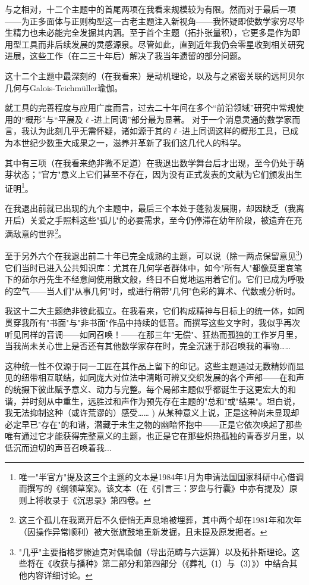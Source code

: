 {{与之相对，十二个主题中的首尾两项在我看来规模较为有限。然而对于最后一项——为正多面体与正则构型这一古老主题注入新视角——我怀疑即使数学家穷尽毕生精力也未必能完全发掘其内涵。至于首个主题（拓扑张量积），它更多是作为即用型工具而非后续发展的灵感源泉。尽管如此，直到近年我仍会零星收到相关研究进展，这些工作（在二三十年后）解决了我当年遗留的部分问题。

这十二个主题中最深刻的（在我看来）是动机理论，以及与之紧密关联的远阿贝尔几何与Galois-Teichmüller瑜伽。

就工具的完善程度与应用广度而言，过去二十年间在多个“前沿领域”研究中常规使用的“概形”与“平展及$\ell$-进上同调”部分最为显著。
对于一个消息灵通的数学家而言，我认为此刻几乎无需怀疑，诸如源于其的$\ell$-进上同调这样的概形工具，已成为本世纪少数重大成果之一，滋养并革新了我们这几代人的科学。

其中有三项（在我看来绝非微不足道）在我退出数学舞台后才出现，至今仍处于萌芽状态；"官方"意义上它们甚至不存在，因为没有正式发表的文献为它们颁发出生证明\footnote{唯一"半官方"提及这三个主题的文本是1984年1月为申请法国国家科研中心借调而撰写的《纲领草案》。该文本（在《引言三：罗盘与行囊》中亦有提及）原则上将收录于《沉思录》第四卷。}。

在我退出前就已出现的九个主题中，最后三个本处于蓬勃发展期，却因缺乏（我离开后）关爱之手照料这些"孤儿"的必要需求，至今仍停滞在幼年阶段，被遗弃在充满敌意的世界\footnote{这三个孤儿在我离开后不久便悄无声息地被埋葬，其中两个却在1981年和次年（因操作异常顺利）被大张旗鼓地重新发掘，且未提及原发掘者。}。

至于另外六个在我退出前二十年已完全成熟的主题，可以说（除一两点保留意见\footnote{"几乎"主要指格罗滕迪克对偶瑜伽（导出范畴与六运算）以及拓扑斯理论。这些将在《收获与播种》第二部分和第四部分（《葬礼（1）与（3）》）中结合其他内容详细讨论。}）它们当时已进入公共知识库：尤其在几何学者群体中，如今"所有人"都像莫里哀笔下的茹尔丹先生不经意间使用散文般，终日不自觉地运用着它们。它们已成为呼吸的空气——当人们"从事几何"时，或进行稍带"几何"色彩的算术、代数或分析时。

我这十二大主题绝非彼此孤立。在我看来，它们构成精神与目标上的统一体，如同贯穿我所有"书面"与"非书面"作品中持续的低音。而撰写这些文字时，我似乎再次听见同样的音调——如同召唤！——在那三年"无偿"、狂热而孤独的工作岁月里，当我尚未关心世上是否还有其他数学家存在时，完全沉迷于那召唤我的事物……

这种统一性不仅源于同一工匠在其作品上留下的印记。这些主题通过无数精妙而显见的纽带相互联结，如同庞大对位法中清晰可辨又交织发展的各个声部——在和声的统摄下彼此赋予意义、动力与完整。每个局部主题似乎都诞生于这更宏大的和谐，并时刻从中重生，远胜过和声作为预先存在主题的"总和"或"结果"。坦白说，我无法抑制这种（或许荒谬的）感受……
) 从某种意义上说，正是这种尚未显现却必定早已"存在"的和谐，潜藏于未生之物的幽暗怀抱中——正是它依次唤起了那些唯有通过它才能获得完整意义的主题，也正是它在那些炽热孤独的青春岁月里，以低沉而迫切的声音召唤着我...

}}
